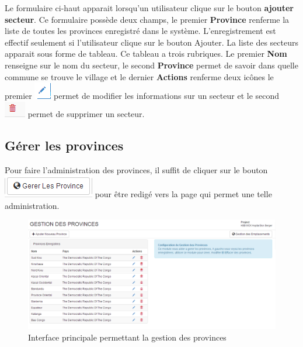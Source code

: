 \documentclass[12pt,a4paper]{report}
\begin{document}
Le formulaire ci-haut apparait lorsqu'un utilisateur clique sur le bouton \textbf{ajouter secteur}. Ce formulaire possède deux champs, le premier \textbf{Province} renferme la liste de toutes les provinces enregistré dans le système. 
L'enregistrement est effectif seulement si l'utilisateur clique sur le bouton Ajouter. La liste des secteurs apparait sous forme de tableau. Ce tableau a trois rubriques. Le premier\textbf{ Nom} renseigne sur le nom du secteur, le second \textbf{Province} permet de savoir dans quelle commune se trouve le village et le dernier \textbf{Actions} renferme deux icônes le premier 
\includegraphics[scale=0.7]{pic/EditUser.png}  permet de modifier les informations sur un secteur et le second 
 \includegraphics[scale=0.7]{pic/DeleteWRed.png}  permet de supprimer un secteur.
\subsection{Gérer les provinces}
Pour faire l'administration des provinces, il suffit de cliquer sur le bouton \includegraphics[scale=0.7]{pic/AdminProvince.png} pour être redigé vers la page qui permet une telle administration.
\begin{figure}[h]
\begin{center}
\includegraphics[width=14cm]{pic/InterfaceGestionProvince.png}
\end{center}
\caption{Interface principale permettant la gestion des provinces}
\label{Aperçue du plan Comptable}
\end{figure}
\end{document}
